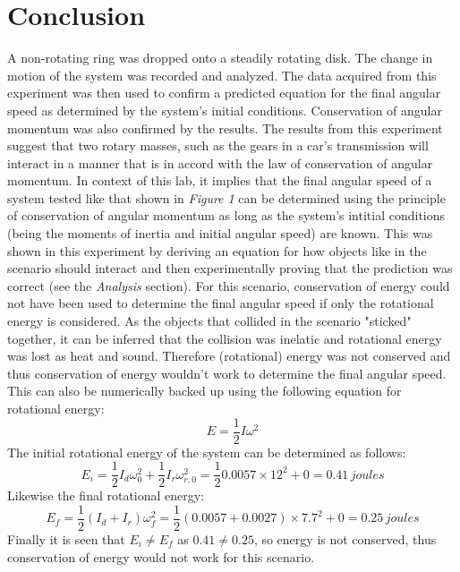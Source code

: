 \documentclass[12pt,letterpaper]{article}
\begin{document}
\section{Conclusion}
A non-rotating ring was dropped onto a steadily rotating disk. The change in motion of the system was recorded and analyzed. The data acquired from this experiment was then used to confirm a predicted equation for the final angular speed as determined by the system's initial conditions. Conservation of angular momentum was also confirmed by the results.
\newline\newline
The results from this experiment suggest that two rotary masses, such as the gears in a car's transmission will interact in a manner that is in accord with the law of conservation of angular momentum. In context of this lab, it implies that the final angular speed of a system tested like that shown in \textit{Figure 1} can be determined using the principle of conservation of angular momentum as long as the system's intitial conditions (being the moments of inertia and initial angular speed) are known. This was shown in this experiment by deriving an equation for how objects like in the scenario should interact and then experimentally proving that the prediction was correct (see the \textit{Analysis} section). 
\newline\newline
For this scenario, conservation of energy could not have been used to determine the final angular speed if only the rotational energy is considered. As the objects that collided in the scenario "sticked" together, it can be inferred that the collision was inelatic and rotational energy was lost as heat and sound. Therefore (rotational) energy was not conserved and thus conservation of energy wouldn't work to determine the final angular speed. This can also be numerically backed up using the following equation for rotational energy:
\begin{equation}
E = \frac{1}{2}I\omega^2
\end{equation}
The initial rotational energy of the system can be determined as follows:
\begin{equation}
E_i = \frac{1}{2}I_d\omega_0^2 + \frac{1}{2}I_r\omega_{r,0}^2 = \frac{1}{2}0.0057\times 12^2 + 0 = 0.41 \hspace{2pt}joules
\end{equation}
Likewise the final rotational energy:
\begin{equation}
E_f = \frac{1}{2}(I_d + I_r)\omega_f^2 = \frac{1}{2}(0.0057 + 0.0027)\times 7.7^2 + 0 = 0.25 \hspace{2pt}joules
\end{equation}
Finally it is seen that \(E_i \neq E_f\) as \(0.41 \neq 0.25\), so energy is not conserved, thus conservation of energy would not work for this scenario.
\end{document}
